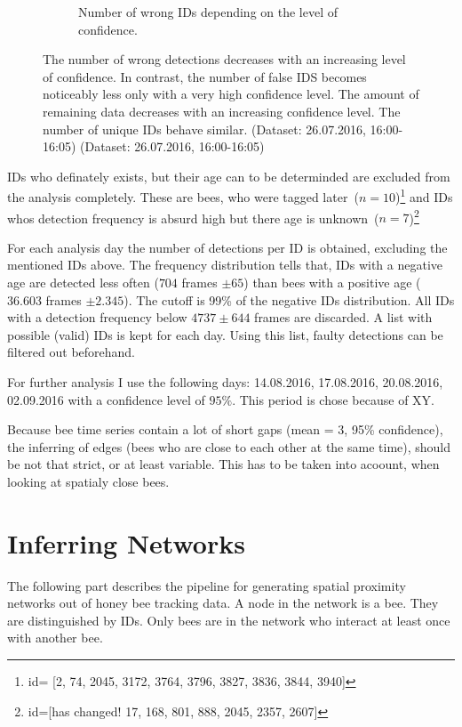 \begin{figure}
\begin{subfigure}[b]{0.45\textwidth}
		\caption[Unique IDs]{Number of wrong IDs depending on the level of confidence.}
		\label{fig:confVSidsquality}
	\end{subfigure}
	\caption[Data Quality]{The number of wrong detections decreases with an increasing level of confidence. In contrast, the number of false IDS becomes noticeably less only with a very high confidence level. The amount of remaining data decreases with an increasing confidence level. The number of unique IDs behave similar. (Dataset: 26.07.2016, 16:00-16:05) (Dataset: 26.07.2016, 16:00-16:05)}
	\label{fig:quality}
\end{figure}

IDs who definately exists, but their age can to be determinded are excluded from the analysis completely. These are bees, who were tagged later~($n=10$)\footnote{id= [2,
	74,
	2045,
	3172,
	3764,
	3796,
	3827,
	3836,
	3844,
	3940]} and IDs whos detection frequency is absurd high but there age is unknown~($n=7$)\footnote{id=[has changed! 
	17,
	168,
	801,
	888,
	2045,
	2357,
	2607]}

For each analysis day the number of detections per ID is obtained, excluding the mentioned IDs above. The frequency distribution tells that, IDs with a negative age are detected less often ($704$ frames $\pm 65$)  than bees with a positive age ($36.603$ frames $\pm 2.345$). The cutoff is 99\% of the negative IDs distribution. All IDs with a detection frequency below $4737 \pm 644$ frames are discarded. A list with possible (valid) IDs is kept for each day. Using this list, faulty detections can be filtered out beforehand.


For further analysis I use the following days: 14.08.2016, 17.08.2016, 20.08.2016, 02.09.2016 with a confidence level of $95\%$. This period is chose because of XY.

Because bee time series contain a lot of short gaps (mean = 3, 95\% confidence), the inferring of edges (bees who are close to each other at the same time), should be not that strict, or at least variable. This has to be taken into acoount, when looking at spatialy close bees.






\clearpage
\section{Inferring Networks}

The following part describes the pipeline for generating spatial proximity networks out of honey bee tracking data. A node in the network is a bee. They are distinguished by IDs. Only bees are in the network who interact at least once with another bee.

